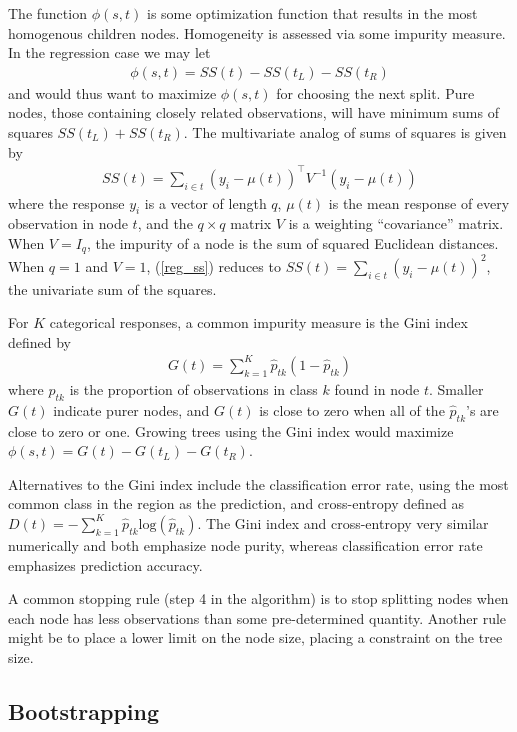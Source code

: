 The function $\phi(s, t)$ is some optimization function that results in the most homogenous children nodes. Homogeneity is assessed via some impurity measure. In the regression case we may let
\begin{eqnarray}
\phi(s, t) = SS(t) - SS(t_L) - SS(t_R)
\label{reg_phi}
\end{eqnarray}
and would thus want to maximize $\phi(s, t)$ for choosing the next split. Pure nodes, those containing closely related observations, will have minimum sums of squares $SS(t_L) + SS(t_R)$. The multivariate analog of sums of squares is given by
\begin{eqnarray}
SS(t) = \sum_{i\in t}(y_i-\mu(t))^\top V^{-1} (y_i-\mu(t))
\label{reg_ss}
\end{eqnarray}
where the response $y_i$ is a vector of length $q$, $\mu(t)$ is the mean response of every observation in node $t$, and the $q\times q$ matrix $V$ is a weighting ``covariance'' matrix. When $V=I_q$, the impurity of a node is the sum of squared Euclidean distances. When $q=1$ and $V=1$, (\ref{reg_ss}) reduces to $SS(t) = \sum_{i\in t}(y_i-\mu(t))^2$, the univariate sum of the squares.

For $K$ categorical responses, a common impurity measure is the Gini index defined by
\begin{eqnarray}
G(t) = \sum_{k=1}^K\hat{p}_{tk}(1-\hat{p}_{tk})
\label{cla_gini}
\end{eqnarray}
where $\hat{p}_{tk}$ is the proportion of observations in class $k$ found in node $t$. Smaller $G(t)$ indicate purer nodes, and $G(t)$ is close to zero when all of the $\hat{p}_{tk}$'s are close to zero or one. Growing trees using the Gini index would maximize $\phi(s, t)=G(t) - G(t_L) - G(t_R)$.

Alternatives to the Gini index include the classification error rate, using the most common class in the region as the prediction, and cross-entropy defined as $D(t) = -\sum_{k=1}^K\hat{p}_{tk}\mathrm{log}(\hat{p}_{tk})$. The Gini index and cross-entropy very similar numerically and both emphasize node purity, whereas classification error rate emphasizes prediction accuracy.

A common stopping rule (step 4 in the algorithm) is to stop splitting nodes when each node has less observations than some pre-determined quantity. Another rule might be to place a lower limit on the node size, placing a constraint on the tree size.

\subsection{Bootstrapping}

